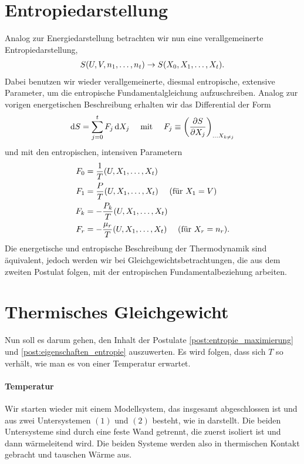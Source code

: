 \section{Entropiedarstellung}
Analog zur Energiedarstellung betrachten wir nun eine verallgemeinerte Entropiedarstellung,
\begin{align*}
    S(U,V,n_1,\ldots,n_t) \rightarrow S(X_0,X_1,\ldots,X_t).
\end{align*}
Dabei benutzen wir wieder verallgemeinerte, diesmal entropische, extensive Parameter, um die entropische Fundamentalgleichung aufzuschreiben. Analog zur vorigen energetischen Beschreibung erhalten wir das Differential der Form
\begin{align*}
    \mathop{}\!\mathrm{d} S = \sum_{j=0}^tF_j\mathop{}\!\mathrm{d} X_j \quad\text{ mit } \quad F_j\equiv\left( \frac{\partial S}{\partial X_j} \right)_{\ldots X_{k\neq j}}
\end{align*}
und mit den entropischen, intensiven Parametern
\begin{align*}
    F_0 & =\frac{1}{T}(U,X_1,\ldots,X_t)                                      \\
    F_1 & =\frac{P}{T}(U,X_1,\ldots,X_t) \quad\text{ (für $X_1=V$)}           \\
    F_k & =-\frac{P_k}{T}(U,X_1,\ldots,X_t)                                   \\
    F_r & =-\frac{\mu_r}{T}(U,X_1,\ldots,X_t) \quad\text{ (für $X_r=n_r$)}.
\end{align*}
Die energetische und entropische Beschreibung der Thermodynamik sind äquivalent, jedoch werden wir bei Gleichgewichtsbetrachtungen, die aus dem zweiten Postulat folgen, mit der entropischen Fundamentalbeziehung arbeiten.

\section{Thermisches Gleichgewicht\label{sec:thermisches_gleichgewicht}}

Nun soll es darum gehen, den Inhalt der Postulate \ref{post:entropie_maximierung} und \ref{post:eigenschaften_entropie} auszuwerten.
Es wird folgen, dass sich $T$ so verhält, wie man es von einer Temperatur erwartet.

\paragraph*{Temperatur}

Wir starten wieder mit einem Modellsystem, das insgesamt abgeschlossen ist und aus zwei Untersystemen $(1)$ und $(2)$ besteht, wie in  darstellt.
Die beiden Untersysteme sind durch eine feste Wand getrennt, die zuerst isoliert ist und dann wärmeleitend wird. Die beiden Systeme werden also in thermischen Kontakt gebracht und tauschen Wärme aus.

